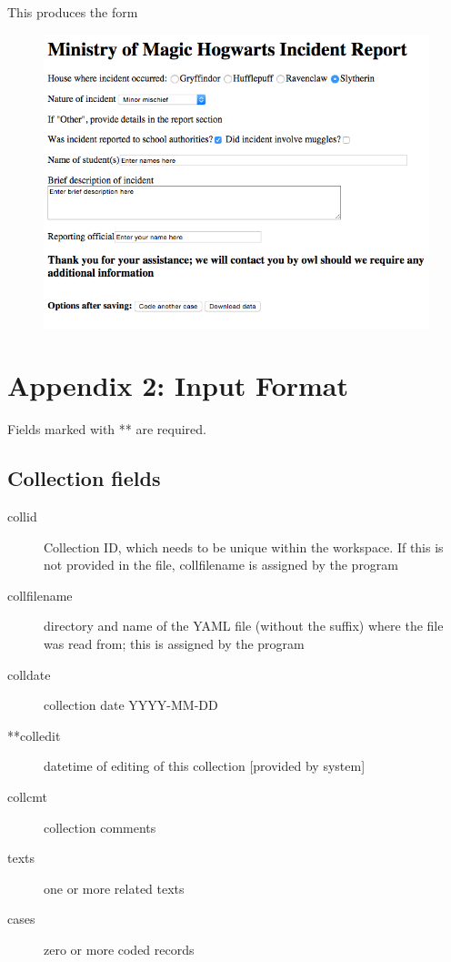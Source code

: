 \documentclass[letterpaper,10pt,english]{sphinxmanual}
\begin{document}
This produces the form
\begin{figure}[htbp]
\centering

\includegraphics{demo_template.png}
\end{figure}


\chapter{Appendix 2: Input Format}
\label{appendix2:appendix-2-input-format}\label{appendix2::doc}
Fields marked with ** are required.


\section{Collection fields}
\label{appendix2:collection-fields}\begin{description}
\item[{collid}] \leavevmode
Collection ID, which needs to be unique within the workspace. If
this is not provided in the file, collfilename is assigned by the
program

\item[{collfilename}] \leavevmode
directory and name of the YAML file (without the suffix) where the
file was read from; this is assigned by the program

\item[{colldate}] \leavevmode
collection date YYYY-MM-DD

\item[{**colledit}] \leavevmode
datetime of editing of this collection  {[}provided by system{]}

\item[{collcmt}] \leavevmode
collection comments

\item[{texts}] \leavevmode
one or more related texts

\item[{cases}] \leavevmode
zero or more coded records

\end{description}
\end{document}
